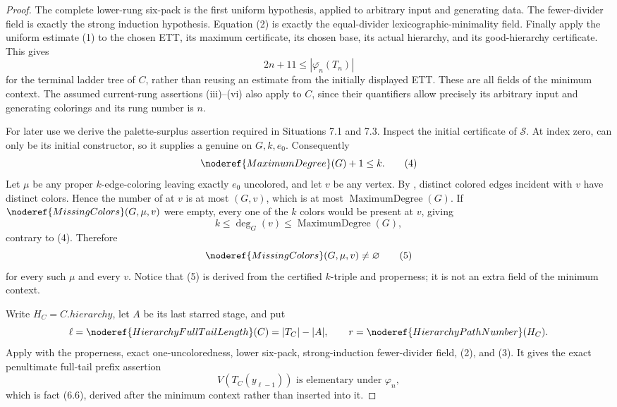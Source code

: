 \begin{proof}
The complete lower-rung six-pack is the first uniform hypothesis, applied
to arbitrary input and generating data.  The fewer-divider field is exactly
the strong induction hypothesis.  Equation (2) is exactly the
equal-divider lexicographic-minimality field.  Finally apply the uniform
estimate (1) to the chosen ETT, its maximum certificate, its chosen base,
its actual hierarchy, and its good-hierarchy certificate.  This gives
\[
             2n+11\leq|\overline{\varphi_n}(T_n)|             \tag{3}
\]
for the terminal ladder tree of \(C\), rather than reusing an estimate from
the initially displayed ETT.  These are all fields of the minimum context.
The assumed current-rung assertions (iii)--(vi) also apply to \(C\), since
their quantifiers allow precisely its arbitrary input and generating
colorings and its rung number is \(n\).

For later use we derive the palette-surplus assertion required in Situations
7.1 and 7.3.  Inspect the initial certificate of \(\mathcal S\).  At index
zero,  can only be its initial constructor, so
it supplies a genuine  on \(G,k,e_0\).  Consequently
\[
                       \noderef{MaximumDegree}(G)+1\leq k.    \tag{4}
\]
Let \(\mu\) be any proper \(k\)-edge-coloring leaving exactly \(e_0\)
uncolored, and let \(v\) be any vertex.  By
, distinct colored edges incident with \(v\)
have distinct colors.  Hence the number of  at \(v\)
is at most \((G,v)\), which is at most
\(\operatorname{MaximumDegree}(G)\).  If
\(\noderef{MissingColors}(G,\mu,v)\) were empty, every one of the \(k\)
colors would be present at \(v\), giving
\[
 k\leq\deg_G(v)\leq\operatorname{MaximumDegree}(G),
\]
contrary to (4).  Therefore
\[
 \noderef{MissingColors}(G,\mu,v)\ne\varnothing              \tag{5}
\]
for every such \(\mu\) and every \(v\).  Notice that (5) is derived from
the certified \(k\)-triple and properness; it is not an extra field of the
minimum context.

Write \(H_C=C.\mathit{hierarchy}\), let \(A\) be its last starred stage, and
put
\[
 \ell=\noderef{HierarchyFullTailLength}(C)=|T_C|-|A|,
 \qquad r=\noderef{HierarchyPathNumber}(H_C).
\]
Apply  with the
properness, exact one-uncoloredness, lower six-pack, strong-induction
fewer-divider field, (2), and (3).  It gives the exact penultimate full-tail
prefix assertion
\[
 V(T_C(y_{\ell-1}))\text{ is elementary under }\varphi_n,     \tag{6}
\]
which is fact (6.6), derived after the minimum context rather than inserted
into it.


\end{proof}
